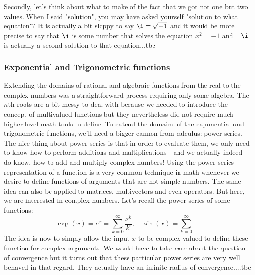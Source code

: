 \medskip
Secondly, let's think about what to make of the fact that we got not one but two values. When I said "solution", you may have asked yourself "solution to what equation"? It is actually a bit sloppy to say $\i = \sqrt{-1}$ and it would be more precise to say that $\i$ is some number that solves the equation $x^2 = -1$ and $-\i$ is actually a second solution to that equation...tbc




\subsubsection{Exponential and Trigonometric functions}
Extending the domains of rational and algebraic functions from the real to the complex numbers was a straightforward process requiring only some algebra. The $n$th roots are a bit messy to deal with because we needed to introduce the concept of multivalued functions but they nevertheless did not require much higher level math tools to define. To extend the domains of the exponential and trigonometric functions, we'll need a bigger cannon from calculus: power series. The nice thing about power series is that in order to evaluate them, we only need to know how to perform additions and multiplications - and we actually indeed do know, how to add and multiply complex numbers! Using the power series representation of a function is a very common technique in math whenever we desire to define functions of arguments that are not simple numbers. The same idea can also be applied to matrices, multivectors and even operators. But here, we are interested in complex numbers. Let's recall the power series of some functions:
\begin{equation}
 \exp(x) = e^x = \sum_{k=0}^{\infty} \frac{x^k}{k!}, \quad
 \sin(x) =  \sum_{k=0}^{\infty} ...
\end{equation}
The idea is now to simply allow the input $x$ to be complex valued to define these function for complex arguments. We would have to take care about the question of convergence but it turns out that these particular power series are very well behaved in that regard. They actually have an infinite radius of convergence....tbc




